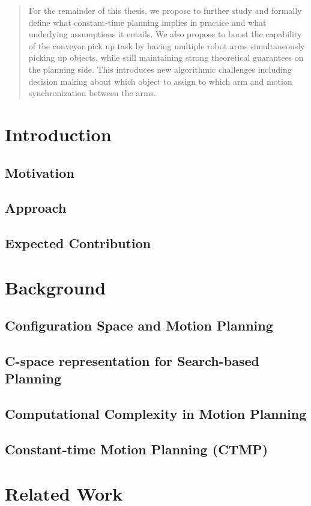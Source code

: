 \documentclass[a4paper,10pt]{article}
\begin{document}
\begin{abstract}
For the remainder of this thesis, we propose to further study and formally define what constant-time planning implies in practice and what underlying assumptions it entails. We also propose to boost the capability of the conveyor pick up task by having multiple robot arms simultaneously picking up objects, while still maintaining strong theoretical guarantees on the planning side. This introduces new algorithmic challenges including decision making about which object to assign to which arm and motion synchronization between the arms.
\end{abstract}
\newpage

\tableofcontents
\newpage

\section{Introduction}
\subsection{Motivation}
\subsection{Approach}
\subsection{Expected Contribution}

\section{Background}
\subsection{Configuration Space and Motion Planning}
\subsection{C-space representation for Search-based Planning}
\subsection{Computational Complexity in Motion Planning}
\subsection{Constant-time Motion Planning (CTMP)}

\section{Related Work}
\end{document}
